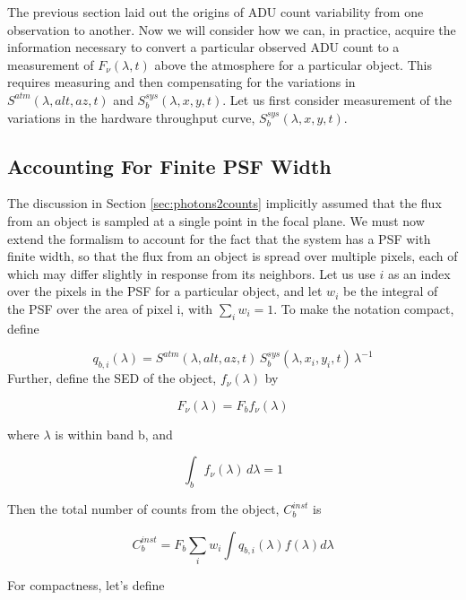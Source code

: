 \documentclass[12pt,preprint]{aastex}
\begin{document}
The previous section laid out the origins of ADU count variability
from one observation to another. Now we will consider how we can, in
practice, acquire the information necessary to convert a particular
observed ADU count to a measurement of $F_\nu(\lambda,t)$ above the
atmosphere for a particular object.  This requires measuring and then 
compensating for the variations in
$S^{atm}(\lambda,alt,az,t)$ and $S_b^{sys}(\lambda,x,y,t)$.
Let us first consider measurement of the variations in the hardware
throughput curve, $S_b^{sys}(\lambda,x,y,t)$. 

\subsection{Accounting For Finite PSF Width}
\label{sec:pixelization}
The discussion in Section \ref{sec:photons2counts} implicitly assumed that the flux from an object is sampled at a single point in the 
focal plane.  We must now extend the formalism to account for the fact that the system has a PSF with finite width, 
so that the flux from an object is spread
over multiple pixels, each of which may differ slightly in response from its neighbors.   Let us use $i$ as an index over the
pixels in the PSF for a particular object, and let $w_i$ be the integral of the PSF over the area of pixel i, with
$\sum_i{w_i}=1$.  To make the
notation compact, define

\begin{equation}
q_{b,i}(\lambda) = {S^{atm}(\lambda,alt,az,t)\, S_b^{sys}(\lambda,x_i,y_i,t) \, \lambda^{-1}}
\end{equation}
Further, define the SED of the object, $f_\nu(\lambda)$ by

\begin{equation}
F_\nu(\lambda) = F_b f_\nu(\lambda)
\end{equation}

where $\lambda$ is within band b, and

\begin{equation}
\int_b {f_\nu(\lambda) \, d\lambda} = 1
\end{equation}

Then the total number of counts from the object, $C_b^{inst}$ is

\begin{equation}
C_b^{inst} = F_b \sum_i {w_i \int {q_{b,i}(\lambda) f(\lambda)  d\lambda}}
\end{equation}

For compactness, let's define
\end{document}
